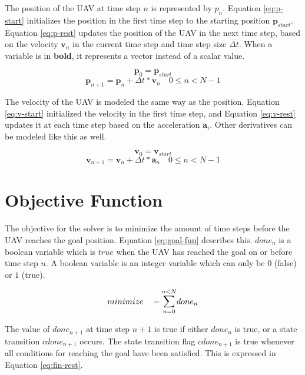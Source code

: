 The position of the UAV at time step $n$ is represented by $p_n$. Equation \ref{eq:p-start} initializes the position in the first time step to the starting position $\boldsymbol{p}_{start}$. Equation \ref{eq:p-rest} updates the position of the UAV in the next time step, based on the velocity $\boldsymbol{v}_n$ in the current time step and time step size $\Delta t$. When a variable is in \textbf{bold}, it represents a vector instead of a scalar value.

\begin{equation}
\label{eq:p-start}
\boldsymbol{p}_0 = \boldsymbol{p}_{start}
\end{equation}
\begin{equation}
\label{eq:p-rest}
\boldsymbol{p}_{n+1} = \boldsymbol{p}_{n} + \Delta t * \boldsymbol{v}_{n}  \quad 0 \leq n < N - 1
\end{equation}

The velocity of the UAV is modeled the same way as the position. Equation \ref{eq:v-start} initialized the velocity in the first time step, and Equation \ref{eq:v-rest} updates it at each time step based on the acceleration $\boldsymbol{a}_i$. Other derivatives can be modeled like this as well.

\begin{equation}
\label{eq:v-start}
\boldsymbol{v}_0 =\boldsymbol{v}_{start}
\end{equation}
\begin{equation}
\label{eq:v-rest}
\boldsymbol{v}_{n+1} =\boldsymbol{v}_{n} + \Delta t * \boldsymbol{a}_{n}  \quad 0 \leq n < N - 1
\end{equation}

\section{Objective Function}
\label{subsec:obj-fun}
The objective for the solver is to minimize the amount of time steps before the UAV reaches the goal position. Equation \ref{eq:goal-fun} describes this. $done_n$ is a boolean variable which is $true$ when the UAV has reached the goal on or before time step $n$. A boolean variable is an integer variable which can only be $0$ (false) or $1$ (true).


\begin{equation}
\label{eq:goal-fun}
minimize \quad - \mathlarger{\sum}_{n=0}^{n < N} done_n
\end{equation}

The value of $done_{n+1}$ at time step $n + 1$ is true if either $done_n$ is true, or a state transition $cdone_{n+1}$ occurs. The state transition flag $cdone_{n+1}$ is true whenever all conditions for reaching the goal have been satisfied. This is expressed in Equation \ref{eq:fin-rest}.

